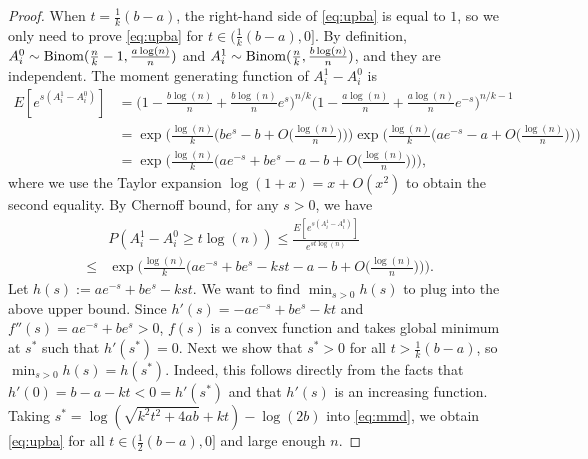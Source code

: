 \documentclass{article}
\begin{document}
\begin{proof}
When $t=\frac{1}{k}(b-a)$, the right-hand side of \eqref{eq:upba} is equal to $1$, so we only need to prove \eqref{eq:upba} for $t\in (\frac{1}{k}(b-a), 0]$.
By definition,
$A^0_i\sim \operatorname{Binom}(\frac{n}{k}-1,\frac{a\log(n)}{n})$ and $A^1_i\sim \operatorname{Binom}(\frac{n}{k}, \frac{b\log(n)}{n})$, and they are independent.
The moment generating function of $A^1_i-A^0_i$ is
\begin{align*}
E[e^{s(A^1_i-A^0_i)}]
& =\Big(1-\frac{b\log(n)}{n}+\frac{b\log(n)}{n} e^s \Big)^{n/k}
\Big(1-\frac{a\log(n)}{n}+\frac{a\log(n)}{n} e^{-s} \Big)^{n/k-1}  \\
& = 
\exp\Big(\frac{\log(n)}{k} \Big( b e^s-b +O\big(\frac{\log(n)}{n}\big) \Big)\Big)
\exp\Big(\frac{\log(n)}{k} \Big( a e^{-s}-a + O\big(\frac{\log(n)}{n}\big) \Big) \Big)
 \\
& = 
\exp\Big(\frac{\log(n)}{k} \Big( a e^{-s}+b e^s-a-b + O\big(\frac{\log(n)}{n}\big) \Big)\Big) ,
\end{align*}
where we use the Taylor expansion $\log(1+x)=x+O(x^2)$ to obtain the second equality.
By Chernoff bound, for any $s>0$, we have
\begin{equation} \label{eq:mmd}
\begin{aligned}
& P(A^1_i-A^0_i\ge t\log(n))\le
\frac{E[e^{s(A^1_i-A^0_i)}]}{e^{st\log(n)}}  \\
 \le & \exp\Big(\frac{\log(n)}{k} \Big( a e^{-s}+b e^s -kst -a-b + O\big(\frac{\log(n)}{n}\big) \Big)\Big)  .
 \end{aligned}
\end{equation}
Let $h(s):=a e^{-s}+be^s-kst$. We want to find $\min_{s>0} h(s)$ to plug into the above upper bound. Since 
$h'(s)=-ae^{-s}+be^s-kt$ and 
$f''(s)=ae^{-s}+be^s>0$, $f(s)$ is a convex function and takes global minimum at $s^\ast$ such that $h'(s^\ast)=0$. Next we show that $s^\ast>0$ for all $t>\frac{1}{k}(b-a)$, so $\min_{s>0}h(s)=h(s^\ast)$. Indeed, this follows directly from the facts that $h'(0)=b-a-kt<0=h'(s^\ast)$ and that $h'(s)$ is an increasing function. Taking $s^\ast=\log(\sqrt{k^2t^2+4ab}+kt)-\log(2b)$ into \eqref{eq:mmd}, we obtain \eqref{eq:upba} for all $t\in(\frac{1}{2}(b-a), 0]$ and large enough $n$.
\end{proof}
\end{document}
